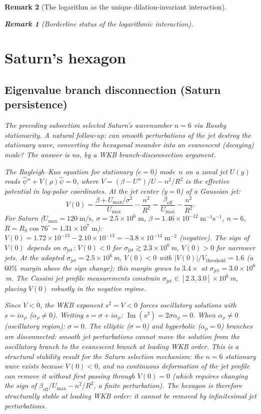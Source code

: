 \documentclass[12pt, a4paper]{article}
\newtheorem{remark}{Remark}[section]
\numberwithin{equation}{section}
\begin{document}
\begin{remark}[The logarithm as the unique dilation-invariant interaction]
\begin{remark}[Borderline status of the logarithmic interaction]
\section{Saturn's hexagon}
\label{sec:saturn}

\subsection{Eigenvalue branch disconnection (Saturn persistence)}

The preceding subsection selected Saturn's wavenumber $n = 6$ via
Rossby stationarity.  A natural follow-up: can smooth perturbations
of the jet destroy the stationary wave, converting the hexagonal
meander into an evanescent (decaying) mode?  The answer is no, by
a WKB branch-disconnection argument.

The Rayleigh--Kuo equation for stationary ($c = 0$) mode~$n$ on a
zonal jet $U(y)$ reads $\hat\psi'' + V(\rho)\hat\psi = 0$, where
$V = (\beta - U'')/U - n^2/R^2$ is the effective potential in
log-polar coordinates.  At the jet center ($y = 0$) of a Gaussian jet:
\[
  V(0) = \frac{\beta + U_{\max}/\sigma^2}{U_{\max}} - \frac{n^2}{R^2}
  = \frac{\beta_{\mathrm{eff}}}{U_{\max}} - \frac{n^2}{R^2}.
\]
For Saturn ($U_{\max} = 120\;\mathrm{m/s}$, $\sigma = 2.5\times
10^6\;\mathrm{m}$, $\beta = 1.46\times 10^{-12}\;\mathrm{m^{-1}
s^{-1}}$, $n = 6$, $R = R_{\mathrm{S}}\cos 76^\circ = 1.31\times
10^7\;\mathrm{m}$):
$V(0) = 1.72\times 10^{-13} - 2.10\times 10^{-13} =
-3.8\times 10^{-14}\;\mathrm{m}^{-2}$ (negative).
The sign of $V(0)$ depends on $\sigma_{\mathrm{jet}}$:
$V(0) < 0$ for $\sigma_{\mathrm{jet}} \gtrsim 2.3 \times 10^6$\,m,
$V(0) > 0$ for narrower jets.  At the adopted
$\sigma_{\mathrm{jet}} = 2.5 \times 10^6$\,m, $V(0) < 0$ with
$|V(0)|/V_{\mathrm{threshold}} = 1.6$ (a $60\%$ margin above the
sign change); this margin grows to $3.4\times$ at
$\sigma_{\mathrm{jet}} = 3.0 \times 10^6$\,m.  The Cassini
jet profile measurements constrain
$\sigma_{\mathrm{jet}} \in [2.3, 3.0] \times 10^6$\,m, placing
$V(0)$ robustly in the negative regime.

Since $V < 0$, the WKB exponent $s^2 = V < 0$ forces oscillatory
solutions with $s = i\alpha_\rho$ ($\alpha_\rho \ne 0$).  Writing
$s = \sigma + i\alpha_\rho$:
$\operatorname{Im}(s^2) = 2\sigma\alpha_\rho = 0$.
When $\alpha_\rho \ne 0$ (oscillatory region): $\sigma = 0$.
The elliptic ($\sigma = 0$) and hyperbolic ($\alpha_\rho = 0$)
branches are disconnected: smooth jet perturbations cannot move the
solution from the oscillatory branch to the evanescent branch at
leading WKB order.  This is a structural stability result for the
Saturn selection mechanism: the $n = 6$ stationary wave exists
because $V(0) < 0$, and no continuous deformation of the jet profile
can remove it without first passing through $V(0) = 0$ (which
requires changing the sign of $\beta_{\mathrm{eff}}/U_{\max} -
n^2/R^2$, a finite perturbation).  The hexagon is therefore
structurally stable at leading WKB order: it cannot be removed by
infinitesimal jet perturbations.



\end{remark}
\end{remark}
\end{document}
